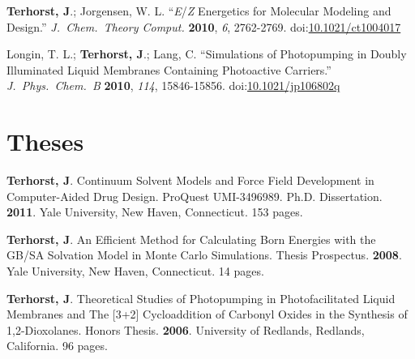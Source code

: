 \documentclass[10pt]{article}
\newcommand*\doilink[1]{\href{http://dx.doi.org/#1}{#1}}
\newcommand*\doi[1]{doi:\doilink{#1}}
\newcommand*\pubitem[7]{{#1} {``#2''} \textit{#3} \textbf{#4}, \textit{#5}, #6. \doi{#7}}
\newcommand*\thesis[7]{#1 #2 #3. \textbf{#4}. #5, #6. {#7 pages.}}
\begin{document}

\pubitem{\textbf{Terhorst, J}.; Jorgensen, W. L.}
{\textit{E}/\textit{Z} Energetics for Molecular Modeling and Design.}
{J.\ Chem.\ Theory Comput.}
{2010}{6}%
{2762-2769}{10.1021/ct1004017}

\pubitem{Longin, T. L.; \textbf{Terhorst, J}.; Lang, C.}
{Simulations of Photopumping in Doubly Illuminated Liquid Membranes Containing Photoactive Carriers.}
{J.\ Phys.\ Chem.\ B}
{2010}{114}%
{15846-15856}{10.1021/jp106802q}


\section{Theses}


\thesis{\textbf{Terhorst, J}.}
{Continuum Solvent Models and Force Field Development in Computer-Aided Drug Design. ProQuest UMI-3496989.}
{Ph.D. Dissertation}{2011}{Yale University}{New Haven, Connecticut}{153} 

\thesis{\textbf{Terhorst, J}.}
{An Efficient Method for Calculating Born Energies with the GB/SA Solvation Model in Monte Carlo Simulations.}
{Thesis Prospectus}{2008}{Yale University}{New Haven, Connecticut}{14}

\thesis{\textbf{Terhorst, J}.}
{Theoretical Studies of Photopumping in Photofacilitated Liquid Membranes and The [3+2] Cycloaddition of Carbonyl Oxides in the Synthesis of 1,2-Dioxolanes.}
{Honors Thesis}{2006}{University of Redlands}{Redlands, California}{96}

\end{document}
